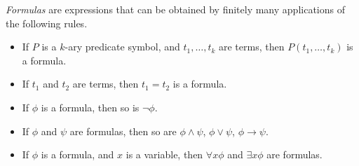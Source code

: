 \begin{dfn}
\emph{Formulas} are expressions that can be obtained by finitely many applications of the following rules.
\begin{itemize}
\item
If $P$ is a $k$-ary predicate symbol, and $t_1, \ldots, t_k$ are terms, then $P(t_1, \ldots, t_k)$ is a formula.
\item
If $t_1$ and $t_2$ are terms, then $t_1 = t_2$ is a formula.
\item
If $\phi$ is a formula, then so is $\neg \phi$.
\item
If $\phi$ and $\psi$ are formulas, then so are $\phi \wedge \psi$, $\phi \vee \psi$, $\phi \to \psi$.
\item
If $\phi$ is a formula, and $x$ is a variable, then $\forall x \phi$ and $\exists x \phi$ are formulas.
\end{itemize}
\end{dfn}